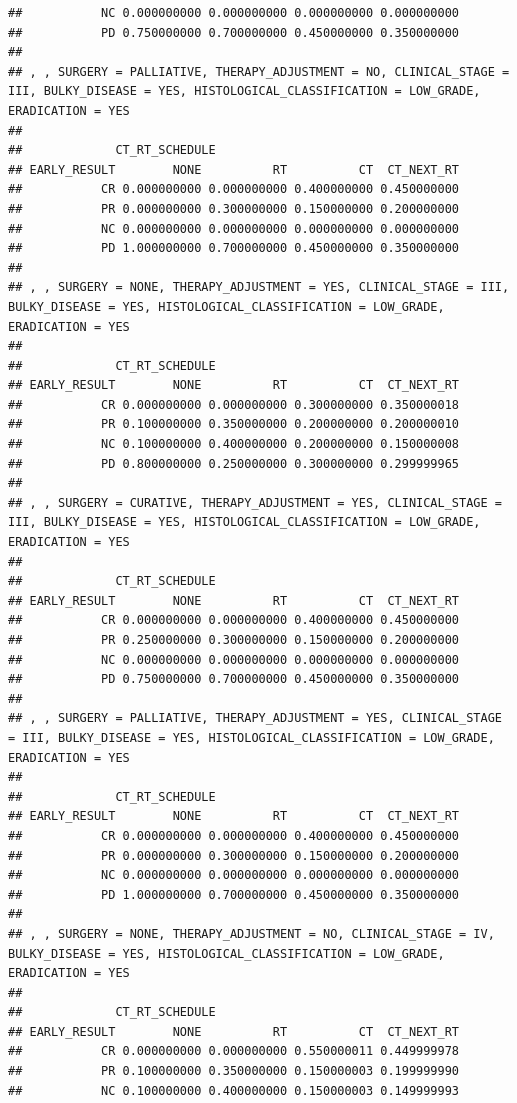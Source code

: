 \documentclass[]{article}
\begin{document}
\begin{verbatim}
##           NC 0.000000000 0.000000000 0.000000000 0.000000000
##           PD 0.750000000 0.700000000 0.450000000 0.350000000
## 
## , , SURGERY = PALLIATIVE, THERAPY_ADJUSTMENT = NO, CLINICAL_STAGE = III, BULKY_DISEASE = YES, HISTOLOGICAL_CLASSIFICATION = LOW_GRADE, ERADICATION = YES
## 
##             CT_RT_SCHEDULE
## EARLY_RESULT        NONE          RT          CT  CT_NEXT_RT
##           CR 0.000000000 0.000000000 0.400000000 0.450000000
##           PR 0.000000000 0.300000000 0.150000000 0.200000000
##           NC 0.000000000 0.000000000 0.000000000 0.000000000
##           PD 1.000000000 0.700000000 0.450000000 0.350000000
## 
## , , SURGERY = NONE, THERAPY_ADJUSTMENT = YES, CLINICAL_STAGE = III, BULKY_DISEASE = YES, HISTOLOGICAL_CLASSIFICATION = LOW_GRADE, ERADICATION = YES
## 
##             CT_RT_SCHEDULE
## EARLY_RESULT        NONE          RT          CT  CT_NEXT_RT
##           CR 0.000000000 0.000000000 0.300000000 0.350000018
##           PR 0.100000000 0.350000000 0.200000000 0.200000010
##           NC 0.100000000 0.400000000 0.200000000 0.150000008
##           PD 0.800000000 0.250000000 0.300000000 0.299999965
## 
## , , SURGERY = CURATIVE, THERAPY_ADJUSTMENT = YES, CLINICAL_STAGE = III, BULKY_DISEASE = YES, HISTOLOGICAL_CLASSIFICATION = LOW_GRADE, ERADICATION = YES
## 
##             CT_RT_SCHEDULE
## EARLY_RESULT        NONE          RT          CT  CT_NEXT_RT
##           CR 0.000000000 0.000000000 0.400000000 0.450000000
##           PR 0.250000000 0.300000000 0.150000000 0.200000000
##           NC 0.000000000 0.000000000 0.000000000 0.000000000
##           PD 0.750000000 0.700000000 0.450000000 0.350000000
## 
## , , SURGERY = PALLIATIVE, THERAPY_ADJUSTMENT = YES, CLINICAL_STAGE = III, BULKY_DISEASE = YES, HISTOLOGICAL_CLASSIFICATION = LOW_GRADE, ERADICATION = YES
## 
##             CT_RT_SCHEDULE
## EARLY_RESULT        NONE          RT          CT  CT_NEXT_RT
##           CR 0.000000000 0.000000000 0.400000000 0.450000000
##           PR 0.000000000 0.300000000 0.150000000 0.200000000
##           NC 0.000000000 0.000000000 0.000000000 0.000000000
##           PD 1.000000000 0.700000000 0.450000000 0.350000000
## 
## , , SURGERY = NONE, THERAPY_ADJUSTMENT = NO, CLINICAL_STAGE = IV, BULKY_DISEASE = YES, HISTOLOGICAL_CLASSIFICATION = LOW_GRADE, ERADICATION = YES
## 
##             CT_RT_SCHEDULE
## EARLY_RESULT        NONE          RT          CT  CT_NEXT_RT
##           CR 0.000000000 0.000000000 0.550000011 0.449999978
##           PR 0.100000000 0.350000000 0.150000003 0.199999990
##           NC 0.100000000 0.400000000 0.150000003 0.149999993

\end{verbatim}
\end{document}
